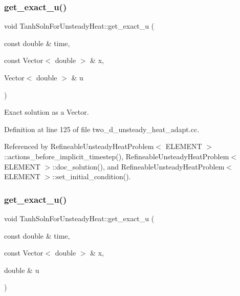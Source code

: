 \subsubsection{\texorpdfstring{get\+\_\+exact\+\_\+u()}{get\_exact\_u()}\hspace{0.1cm}{\footnotesize\ttfamily [1/2]}}
{\footnotesize\ttfamily void Tanh\+Soln\+For\+Unsteady\+Heat\+::get\+\_\+exact\+\_\+u (\begin{DoxyParamCaption}\item[{const double \&}]{time,  }\item[{const Vector$<$ double $>$ \&}]{x,  }\item[{Vector$<$ double $>$ \&}]{u }\end{DoxyParamCaption})}



Exact solution as a Vector. 



Definition at line 125 of file two\+\_\+d\+\_\+unsteady\+\_\+heat\+\_\+adapt.\+cc.



Referenced by Refineable\+Unsteady\+Heat\+Problem$<$ E\+L\+E\+M\+E\+N\+T $>$\+::actions\+\_\+before\+\_\+implicit\+\_\+timestep(), Refineable\+Unsteady\+Heat\+Problem$<$ E\+L\+E\+M\+E\+N\+T $>$\+::doc\+\_\+solution(), and Refineable\+Unsteady\+Heat\+Problem$<$ E\+L\+E\+M\+E\+N\+T $>$\+::set\+\_\+initial\+\_\+condition().

\mbox{\label{namespaceTanhSolnForUnsteadyHeat_a62871b93b792298dcdade93bde0085ff}} 
\subsubsection{\texorpdfstring{get\+\_\+exact\+\_\+u()}{get\_exact\_u()}\hspace{0.1cm}{\footnotesize\ttfamily [2/2]}}
{\footnotesize\ttfamily void Tanh\+Soln\+For\+Unsteady\+Heat\+::get\+\_\+exact\+\_\+u (\begin{DoxyParamCaption}\item[{const double \&}]{time,  }\item[{const Vector$<$ double $>$ \&}]{x,  }\item[{double \&}]{u }\end{DoxyParamCaption})}



